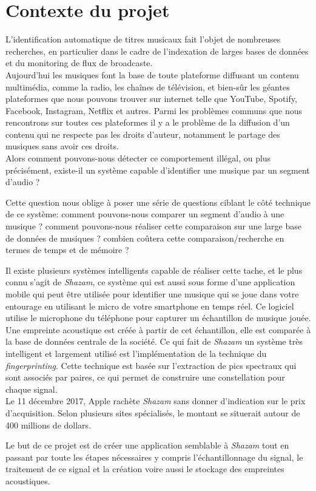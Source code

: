 \documentclass[11pt, report, french]{scrreprt}
\begin{document}
\section{Contexte du projet}
L’identification automatique de titres musicaux fait l’objet de nombreuses recherches, en particulier dans le cadre de l’indexation de larges bases de données et du monitoring de flux de broadcaste. \\
Aujourd'hui les musiques font la base de toute plateforme diffusant un contenu multimédia, comme la radio, les chaînes de télévision, et bien-sûr les géantes plateformes que nous pouvons trouver sur internet telle que YouTube, Spotify, Facebook, Instagram, Netflix et autres. Parmi les problèmes communs que nous rencontrons sur toutes ces plateformes il y a le problème de la diffusion d'un contenu qui ne respecte pas les droits d'auteur, notamment le partage des musiques sans avoir ces droits.\\
Alors comment pouvons-nous détecter ce comportement illégal, ou plus précisément, existe-il un système capable d'identifier une musique par un segment d'audio ? \\\par
Cette question nous oblige à poser une série de questions ciblant le côté technique de ce système: comment pouvons-nous comparer un segment d'audio à une musique ? comment pouvons-nous réaliser cette comparaison sur une large base de données de musiques ? combien coûtera cette comparaison/recherche en termes de temps et de mémoire ? \\\par
Il existe plusieurs systèmes intelligents capable de réaliser cette tache, et le plus connu s'agit de \textit{Shazam}, ce système qui est aussi sous forme d'une application mobile qui peut être utilisée pour identifier une musique qui se joue dans votre entourage en utilisant le micro de votre smartphone en temps réel. Ce logiciel utilise le microphone du téléphone pour capturer un échantillon de musique jouée. Une empreinte acoustique est créée à partir de cet échantillon, elle est comparée à la base de données centrale de la société. Ce qui fait de \textit{Shazam} un système très intelligent et largement utilisé est l'implémentation de la technique du \textit{fingerprinting}. Cette technique est basée sur l’extraction de pics spectraux qui sont associés par paires, ce qui permet de construire une constellation pour chaque signal. \\
Le 11 décembre 2017, Apple rachète \textit{Shazam} sans donner d'indication sur le prix d'acquisition. Selon plusieurs sites spécialisés, le montant se situerait autour de 400 millions de dollars.\\\par
Le but de ce projet est de créer une application semblable à \textit{Shazam} tout en passant par toute les étapes nécessaires y compris l'échantillonnage du signal, le traitement de ce signal et la création voire aussi le stockage des empreintes acoustiques.
\end{document}
